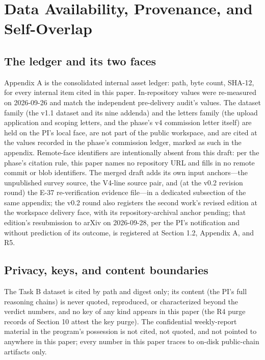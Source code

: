 \documentclass[11pt]{article}
\begin{document}
\section{Data Availability, Provenance, and Self-Overlap}
\label{sec:22}
\subsection{The ledger and its two faces}
\noindent Appendix A is the consolidated internal asset ledger: path, byte count, SHA-12, for every internal item cited in this paper. In-repository values were re-measured on 2026-09-26 and match the independent pre-delivery audit's values. The dataset family (the v1.1 dataset and its nine addenda) and the letters family (the upload application and scoping letters, and the phase's v4 commission letter itself) are held on the PI's local face, are not part of the public workspace, and are cited at the values recorded in the phase's commission ledger, marked as such in the appendix. Remote-face identifiers are intentionally absent from this draft: per the phase's citation rule, this paper names no repository URL and fills in no remote commit or blob identifiers. The merged draft adds its own input anchors—the unpublished survey source, the V4-line source pair, and (at the v0.2 revision round) the E-37 re-verification evidence file—in a dedicated subsection of the same appendix; the v0.2 round also registers the second work's revised edition at the workspace delivery face, with its repository-archival anchor pending; that edition's resubmission to arXiv on 2026-09-28, per the PI's notification and without prediction of its outcome, is registered at Section 1.2, Appendix A, and R5.\par
\subsection{Privacy, keys, and content boundaries}
\noindent The Task B dataset is cited by path and digest only; its content (the PI's full reasoning chains) is never quoted, reproduced, or characterized beyond the verdict numbers, and no key of any kind appears in this paper (the R4 purge records of Section 10 attest the key purge). The confidential weekly-report material in the program's possession is not cited, not quoted, and not pointed to anywhere in this paper; every number in this paper traces to on-disk public-chain artifacts only.\par
\end{document}
